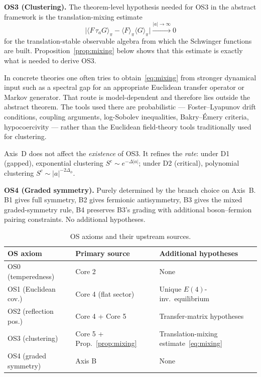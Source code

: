 \documentclass[12pt,a4paper]{article}
\theoremstyle{plain}
\theoremstyle{definition}
\theoremstyle{remark}
\begin{document}
\medskip

\noindent\textbf{OS3 (Clustering).} The theorem-level hypothesis
needed for OS3 in the abstract framework is the translation-mixing
estimate
\begin{equation}
  \big|\langle F \, \tau_a G\rangle_\pi
  - \langle F\rangle_\pi \langle G\rangle_\pi\big|
  \xrightarrow{|a| \to \infty} 0
\end{equation}
for the translation-stable observable algebra from which the
Schwinger functions are built. Proposition~\ref{prop:mixing} below
shows that this estimate is exactly what is needed to derive OS3.

In concrete theories one often tries to obtain~\eqref{eq:mixing} from
stronger dynamical input such as a spectral gap for an appropriate
Euclidean transfer operator or Markov generator. That route is
model-dependent and therefore lies outside the abstract theorem. The
tools used there are probabilistic --- Foster--Lyapunov drift
conditions, coupling arguments, log-Sobolev inequalities,
Bakry--\'Emery criteria, hypocoercivity --- rather than the Euclidean
field-theory tools traditionally used for clustering.

Axis~D does not affect the \emph{existence} of OS3. It refines the
\emph{rate}: under D1 (gapped), exponential clustering
$S^c \sim e^{-\Delta|a|}$; under D2 (critical), polynomial clustering
$S^c \sim |a|^{-2\Delta_\phi}$.

\medskip

\noindent\textbf{OS4 (Graded symmetry).} Purely determined by the
branch choice on Axis~B. B1 gives full symmetry, B2 gives fermionic
antisymmetry, B3 gives the mixed graded-symmetry rule, B4 preserves
B3's grading with additional boson--fermion pairing constraints. No
additional hypotheses.


\begin{table}[ht]
\centering
\renewcommand{\arraystretch}{1.2}
\begin{tabular}{@{}lll@{}}
\toprule
OS axiom & Primary source & Additional hypotheses \\
\midrule
OS0 (temperedness) & Core 2 & None \\
OS1 (Euclidean cov.) & Core 4 (flat sector) &
Unique $E(4)$-inv.\ equilibrium \\
OS2 (reflection pos.) & Core 4 + Core 5 & Transfer-matrix hypotheses \\
OS3 (clustering) & Core 5 + Prop.~\ref{prop:mixing} &
Translation-mixing estimate~\eqref{eq:mixing} \\
OS4 (graded symmetry) & Axis B & None \\
\bottomrule
\end{tabular}
\caption{OS axioms and their upstream sources.}
\label{tab:os}
\end{table}
\end{document}
